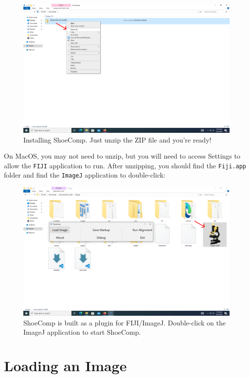 \documentclass[a4paper, oneside]{memoir}
\begin{document}
\begin{figure}[H]
\begin{center}
	\includegraphics[width=0.8\linewidth]{images/step_2-anno.png}
\end{center}
\caption{Installing ShoeComp. Just unzip the ZIP file and you're ready!}
\label{fig:step2}
\end{figure}

On MacOS, you may not need to unzip, but you will need to access Settings to allow the
\texttt{FIJI} application to run. After unzipping, you should find the \texttt{Fiji.app}
folder and find the \texttt{ImageJ} application to double-click:

\begin{figure}[H]
\begin{center}
	\includegraphics[width=0.8\linewidth]{images/step_3-anno.png}
\end{center}
\caption{ShoeComp is built as a plugin for FIJI/ImageJ. Double-click on the ImageJ application to start
ShoeComp.}
\label{fig:step3}
\end{figure}


\section{Loading an Image}
\end{document}
